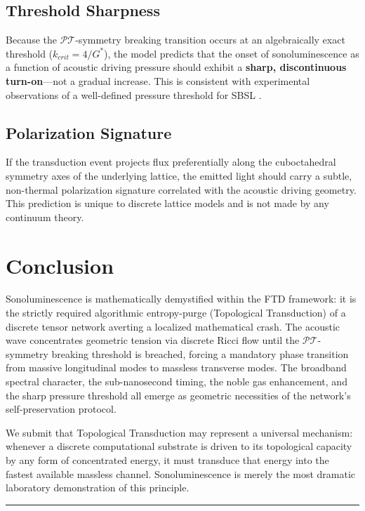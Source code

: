 \documentclass[11pt, letterpaper]{article}
\newcommand{\G}{G^*}
\newcommand{\PT}{\mathcal{PT}}
\theoremstyle{definition}
\theoremstyle{remark}
\begin{document}
\subsection{Threshold Sharpness}
Because the $\PT$-symmetry breaking transition occurs at an algebraically exact threshold ($k_{crit} = 4/\G$), the model predicts that the onset of sonoluminescence as a function of acoustic driving pressure should exhibit a \textbf{sharp, discontinuous turn-on}---not a gradual increase. This is consistent with experimental observations of a well-defined pressure threshold for SBSL \cite{Gaitan1992}.

\subsection{Polarization Signature}
If the transduction event projects flux preferentially along the cuboctahedral symmetry axes of the underlying lattice, the emitted light should carry a subtle, non-thermal polarization signature correlated with the acoustic driving geometry. This prediction is unique to discrete lattice models and is not made by any continuum theory.

\section{Conclusion}

Sonoluminescence is mathematically demystified within the FTD framework: it is the strictly required algorithmic entropy-purge (Topological Transduction) of a discrete tensor network averting a localized mathematical crash. The acoustic wave concentrates geometric tension via discrete Ricci flow until the $\PT$-symmetry breaking threshold is breached, forcing a mandatory phase transition from massive longitudinal modes to massless transverse modes. The broadband spectral character, the sub-nanosecond timing, the noble gas enhancement, and the sharp pressure threshold all emerge as geometric necessities of the network's self-preservation protocol.

We submit that Topological Transduction may represent a universal mechanism: whenever a discrete computational substrate is driven to its topological capacity by any form of concentrated energy, it must transduce that energy into the fastest available massless channel. Sonoluminescence is merely the most dramatic laboratory demonstration of this principle.

\vspace{2em}
\hrule
\vspace{1.5em}
\end{document}
